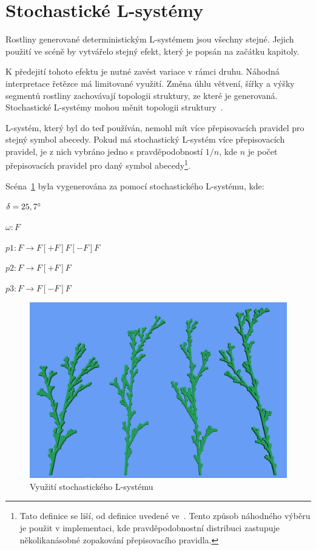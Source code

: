 \documentclass[thesis=M,czech]{FITthesis}[2019/12/23]
\begin{document}
\section{Stochastické L-systémy}
Rostliny generované deterministickým L-systémem jsou všechny stejné. Jejich použití ve scéně by vytvářelo stejný efekt, který je popsán na začátku kapitoly. 

K předejití tohoto efektu je nutné zavést variace v rámci druhu. Náhodná interpretace řetězce má limitované využití. Změna úhlu větvení, šířky a výšky segmentů rostliny zachovávají topologii struktury, ze které je generovaná. Stochastické L-systémy mohou měnit topologii struktury~\cite{abop28}.

L-systém, který byl do teď používán, nemohl mít více pře\-pi\-so\-va\-cích pravidel pro stejný symbol abecedy. Pokud má stochastický L-systém více pře\-pi\-so\-va\-cích pravidel, je z nich vybráno jedno s pravděpodobností $1/n$, kde $n$ je počet přepisovacích pravidel pro daný symbol abecedy\footnote{Tato definice se liší, od definice uvedené ve~\cite{abop28}. Tento způsob náhodného výběru je použit v implementaci, kde pravděpodobnostní distribuci zastupuje několikanásobné zopakování přepisovacího pravidla.}.

Scéna~\ref{fig:plant_stoch} byla vygenerována za pomocí stochastického L-systému, kde:

\bigskip 
$\delta = 25,7\degree$

\medskip
$\omega: F$

\medskip
$p1: F \rightarrow F[+F]F[-F]F$

\medskip
$p2: F \rightarrow F[+F]F$

\medskip
$p3: F \rightarrow F[-F]F$

\begin{figure}\centering
	\includegraphics[width=\textwidth]{images/plant_stoch}
	\caption[Využití stochastického L-systému]{Využití stochastického L-systému}\label{fig:plant_stoch}
\end{figure}
\end{document}
